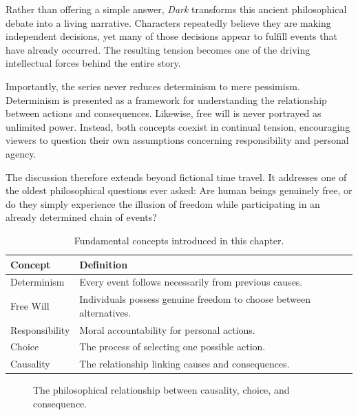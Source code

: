 \documentclass[12pt,oneside,openany]{book}
\begin{document}
Rather than offering a simple answer, \textit{Dark} transforms this ancient
philosophical debate into a living narrative. Characters repeatedly believe
they are making independent decisions, yet many of those decisions appear to
fulfill events that have already occurred. The resulting tension becomes one of
the driving intellectual forces behind the entire story.

Importantly, the series never reduces determinism to mere pessimism.
Determinism is presented as a framework for understanding the relationship
between actions and consequences. Likewise, free will is never portrayed as
unlimited power. Instead, both concepts coexist in continual tension,
encouraging viewers to question their own assumptions concerning responsibility
and personal agency.

The discussion therefore extends beyond fictional time travel. It addresses one
of the oldest philosophical questions ever asked: Are human beings genuinely
free, or do they simply experience the illusion of freedom while participating
in an already determined chain of events?

\begin{table}[H]
\centering
\begin{tabular}{|p{4cm}|p{8cm}|}
\hline
\textbf{Concept} & \textbf{Definition}\\
\hline
Determinism & Every event follows necessarily from previous causes.\\
\hline
Free Will & Individuals possess genuine freedom to choose between alternatives.\\
\hline
Responsibility & Moral accountability for personal actions.\\
\hline
Choice & The process of selecting one possible action.\\
\hline
Causality & The relationship linking causes and consequences.\\
\hline
\end{tabular}
\caption{Fundamental concepts introduced in this chapter.}
\end{table}

\begin{figure}[H]
\centering
{}
\caption{The philosophical relationship between causality, choice, and consequence.}
\end{figure}
\end{document}
